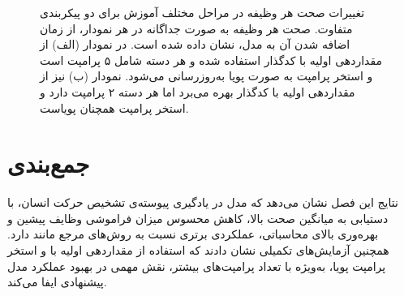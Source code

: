 \begin{figure}
	\centering
	\quad
	\caption[تغییرات صحت هر وظیفه در هر گام آموزشی در مجموعه‌داده‌ی
	]{
تغییرات صحت هر وظیفه در مراحل مختلف آموزش برای دو پیکربندی متفاوت. صحت هر وظیفه به صورت جداگانه در هر نمودار، از زمان اضافه شدن آن به مدل، نشان داده شده است. در نمودار (الف) از مقداردهی اولیه با کدگذار  استفاده شده و هر دسته شامل ۵ پرامپت است و استخر پرامپت به صورت پویا به‌روزرسانی می‌شود. نمودار (ب) نیز از مقداردهی اولیه با کدگذار  بهره می‌برد اما هر دسته ۲ پرامپت دارد و استخر پرامپت همچنان پویاست.
	}
	\label{fig:ablation_study_hmdb}
\end{figure}
\section{جمع‌بندی}
نتایج این فصل نشان می‌دهد که مدل  در یادگیری پیوسته‌ی تشخیص حرکت انسان، با دستیابی به میانگین صحت بالا، کاهش محسوس میزان فراموشی وظایف پیشین و بهره‌وری بالای محاسباتی، عملکردی برتری نسبت به روش‌های مرجع مانند  دارد. همچنین آزمایش‌های تکمیلی نشان دادند که استفاده از مقداردهی اولیه با  و استخر پرامپت پویا، به‌ویژه با تعداد پرامپت‌های بیشتر، نقش مهمی در بهبود عملکرد مدل پیشنهادی ایفا می‌کند.



















